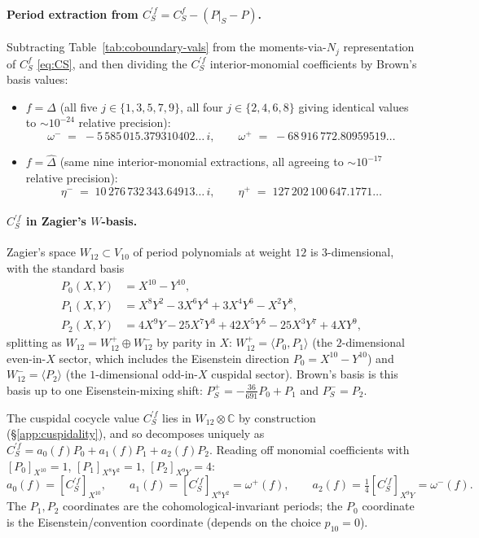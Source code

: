 \documentclass[11pt,letterpaper]{article}
\newcommand{\CC}{\mathbb{C}}
\begin{document}
\paragraph{Period extraction from $C^{\prime f}_S = C^f_S - (P|_S - P)$.}
Subtracting Table~\ref{tab:coboundary-vals} from the moments-via-$N_j$
representation of $C^f_S$ \eqref{eq:CS}, and then dividing the
$C^{\prime f}_S$ interior-monomial coefficients by Brown's basis values:
\begin{itemize}\itemsep=2pt
  \item $f = \Delta$ (all five $j \in \{1, 3, 5, 7, 9\}$, all four
        $j \in \{2, 4, 6, 8\}$ giving identical values to $\sim 10^{-24}$
        relative precision):
        $$\omega^- \;=\; -5\,585\,015.379310402\ldots\,i,
        \qquad
        \omega^+ \;=\; -68\,916\,772.80959519\ldots$$
  \item $f = \widehat\Delta$ (same nine interior-monomial extractions, all
        agreeing to $\sim 10^{-17}$ relative precision):
        $$\eta^- \;=\; 10\,276\,732\,343.64913\ldots\,i,
        \qquad
        \eta^+ \;=\; 127\,202\,100\,647.1771\ldots$$
\end{itemize}

\paragraph{$C^{\prime f}_S$ in Zagier's $W$-basis.}
Zagier's space $W_{12} \subset V_{10}$ of period polynomials at weight $12$
is $3$-dimensional, with the standard basis
\begin{align*}
  P_0(X, Y) &= X^{10} - Y^{10}, \\
  P_1(X, Y) &= X^8 Y^2 - 3X^6 Y^4 + 3X^4 Y^6 - X^2 Y^8, \\
  P_2(X, Y) &= 4X^9 Y - 25 X^7 Y^3 + 42 X^5 Y^5 - 25 X^3 Y^7 + 4 X Y^9,
\end{align*}
splitting as $W_{12} = W_{12}^+ \oplus W_{12}^-$ by parity in $X$:
$W_{12}^+ = \langle P_0, P_1\rangle$ (the $2$-dimensional even-in-$X$ sector,
which includes the Eisenstein direction $P_0 = X^{10} - Y^{10}$) and
$W_{12}^- = \langle P_2\rangle$ (the $1$-dimensional odd-in-$X$ cuspidal
sector).  Brown's basis is this basis up to one Eisenstein-mixing shift:
$P^+_S = -\tfrac{36}{691}P_0 + P_1$ and $P^-_S = P_2$.

The cuspidal cocycle value $C^{\prime f}_S$ lies in $W_{12}\otimes\CC$ by
construction (\S\ref{app:cuspidality}), and so decomposes uniquely as
$C^{\prime f}_S = a_0(f) P_0 + a_1(f) P_1 + a_2(f) P_2$.  Reading off
monomial coefficients with $[P_0]_{X^{10}} = 1$, $[P_1]_{X^8 Y^2} = 1$,
$[P_2]_{X^9 Y} = 4$:
\[
  a_0(f) = [C^{\prime f}_S]_{X^{10}}, \qquad
  a_1(f) = [C^{\prime f}_S]_{X^8 Y^2} = \omega^+(f), \qquad
  a_2(f) = \tfrac{1}{4}[C^{\prime f}_S]_{X^9 Y} = \omega^-(f).
\]
The $P_1, P_2$ coordinates are the cohomological-invariant periods; the
$P_0$ coordinate is the Eisenstein/convention coordinate (depends on the
choice $p_{10} = 0$).
\end{document}
